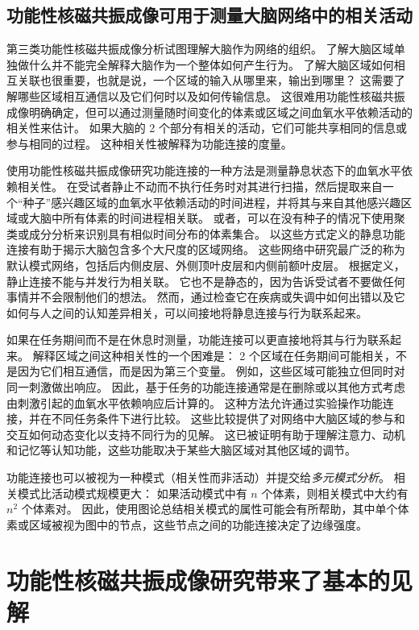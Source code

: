 \subsection{功能性核磁共振成像可用于测量大脑网络中的相关活动}

第三类功能性核磁共振成像分析试图理解大脑作为网络的组织。
了解大脑区域单独做什么并不能完全解释大脑作为一个整体如何产生行为。
了解大脑区域如何相互关联也很重要，也就是说，一个区域的输入从哪里来，输出到哪里？
这需要了解哪些区域相互通信以及它们何时以及如何传输信息。
这很难用功能性核磁共振成像明确确定，但可以通过测量随时间变化的体素或区域之间血氧水平依赖活动的相关性来估计。
如果大脑的 2 个部分有相关的活动，它们可能共享相同的信息或参与相同的过程。
这种相关性被解释为功能连接的度量。


使用功能性核磁共振成像研究功能连接的一种方法是测量静息状态下的血氧水平依赖相关性。 
在受试者静止不动而不执行任务时对其进行扫描，然后提取来自一个“种子”感兴趣区域的血氧水平依赖活动的时间进程，并将其与来自其他感兴趣区域或大脑中所有体素的时间进程相关联。
或者，可以在没有种子的情况下使用聚类或成分分析来识别具有相似时间分布的体素集合。
以这些方式定义的静息功能连接有助于揭示大脑包含多个大尺度的区域网络。
这些网络中研究最广泛的称为默认模式网络，包括后内侧皮层、外侧顶叶皮层和内侧前额叶皮层。
根据定义，静止连接不能与并发行为相关联。
它也不是静态的，因为告诉受试者不要做任何事情并不会限制他们的想法。
然而，通过检查它在疾病或失调中如何出错以及它如何与人之间的认知差异相关，可以间接地将静息连接与行为联系起来。


如果在任务期间而不是在休息时测量，功能连接可以更直接地将其与行为联系起来。
解释区域之间这种相关性的一个困难是： 2 个区域在任务期间可能相关，不是因为它们相互通信，而是因为第三个变量。
例如，这些区域可能独立但同时对同一刺激做出响应。
因此，基于任务的功能连接通常是在删除或以其他方式考虑由刺激引起的血氧水平依赖响应后计算的。
这种方法允许通过实验操作功能连接，并在不同任务条件下进行比较。
这些比较提供了对网络中大脑区域的参与和交互如何动态变化以支持不同行为的见解。
这已被证明有助于理解注意力、动机和记忆等认知功能，这些功能取决于某些大脑区域对其他区域的调节。


功能连接也可以被视为一种模式（相关性而非活动）并提交给\textit{多元模式分析}。 
相关模式比活动模式规模更大：
如果活动模式中有 $n$ 个体素，则相关模式中大约有 $n^2$ 个体素对。
因此，使用图论总结相关模式的属性可能会有所帮助，其中单个体素或区域被视为图中的节点，这些节点之间的功能连接决定了边缘强度。



\section{功能性核磁共振成像研究带来了基本的见解}

